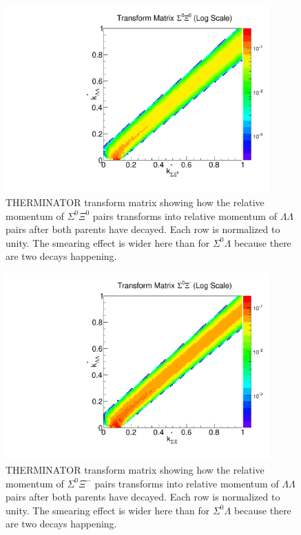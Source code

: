 \begin{figure}[hbtp]
\begin{center}
\includegraphics[width=24pc]{Figures/TransformMatrices/2016-7-20-TransformMatrixSigmaXi0NormLog.pdf}
\end{center}
\caption[Transform matrix for $k^*_{\Sigma^0\Xi^0} \rightarrow k^*_{\Lambda\Lambda}$]{THERMINATOR \cite{Chojnacki:2011hb} transform matrix showing how the relative momentum of $\Sigma^0\Xi^0$ pairs transforms into relative momentum of $\Lambda\Lambda$ pairs after both parents have decayed. Each row is normalized to unity. The smearing effect is wider here than for $\Sigma^0\Lambda$ because there are two decays happening.}
\label{fig:TherminatorSX0}
\end{figure}

\begin{figure}[hbtp]
\begin{center}
\includegraphics[width=24pc]{Figures/TransformMatrices/2016-7-20-TransformMatrixSigmaXiCNormLog.pdf}
\end{center}
\caption[Transform matrix for $k^*_{\Sigma^0\Xi^-} \rightarrow k^*_{\Lambda\Lambda}$]{THERMINATOR \cite{Chojnacki:2011hb} transform matrix showing how the relative momentum of $\Sigma^0\Xi^-$ pairs transforms into relative momentum of $\Lambda\Lambda$ pairs after both parents have decayed. Each row is normalized to unity. The smearing effect is wider here than for $\Sigma^0\Lambda$ because there are two decays happening.}
\label{fig:TherminatorSXc}
\end{figure}

